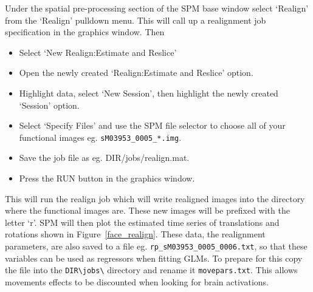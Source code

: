 \documentclass[a4paper,titlepage]{book}
\newcommand{\bi}{\begin{itemize}}
\newcommand{\ei}{\end{itemize}}
\begin{document}
Under the spatial pre-processing section of the SPM base window select `Realign' from the `Realign' pulldown menu. This will call up a realignment job specification 
in the graphics window.
Then
\bi
\item{Select `New Realign:Estimate and Reslice'}
\item{Open the newly created `Realign:Estimate and Reslice' option.}
\item{Highlight data, select `New Session', then highlight the newly created `Session' option.} 
\item{Select `Specify Files' and use the SPM file selector
to choose all of your functional images eg. \verb!sM03953_0005_*.img!.}
\item{Save the job file as eg. {\sf DIR/jobs/realign.mat}}.
\item{Press the RUN button in the graphics window.}
\ei
This 
will run the realign job which will write realigned images into the directory where the functional images
are. These new images will be prefixed with the letter `r'. SPM will then plot the estimated time series of translations and rotations shown in Figure~\ref{face_realign}. These data, the realignment parameters, are also saved to 
a file eg. \verb!rp_sM03953_0005_0006.txt!, so that these variables can be used as regressors when fitting GLMs. To prepare for this copy the file into the 
\verb!DIR\jobs\! directory and rename it \verb!movepars.txt!.
This allows movements effects to be discounted when
looking for brain activations.
\end{document}

